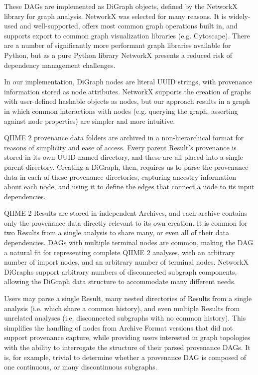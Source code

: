 These DAGs are implemented as DiGraph objects, defined by the NetworkX library
for graph analysis. NetworkX was selected for many reasons. It is widely-used
and well-supported, offers most common graph operations built in, and supports
export to common graph visualization libraries (e.g. Cytoscape). There are a
number of significantly more performant graph libraries available for Python,
but as a pure Python library NetworkX presents a reduced risk of dependency
management challenges.

In our implementation, DiGraph nodes are literal UUID strings, with provenance
information stored as node attributes. NetworkX supports the creation of graphs
with user-defined hashable objects as nodes, but our approach results in a graph
in which common interactions with nodes (e.g. querying the graph, asserting
against node properties) are simpler and more intuitive.

QIIME 2 provenance data folders are archived in a non-hierarchical format for
reasons of simplicity and ease of access. Every parent Result’s provenance is
stored in its own UUID-named directory, and these are all placed into a single
parent directory. Creating a DiGraph, then, requires us to parse the provenance
data in each of these provenance directories, capturing ancestry information
about each node, and using it to define the edges that connect a node to its
input dependencies.

QIIME 2 Results are stored in independent Archives, and each archive contains
only the provenance data directly relevant to its own creation. It is common for
two Results from a single analysis to share many, or even all of their data
dependencies. DAGs with multiple terminal nodes are common, making the DAG a
natural fit for representing complete QIIME 2 analyses, with an arbitrary number
of import nodes, and an arbitrary number of terminal nodes. NetworkX DiGraphs
support arbitrary numbers of disconnected subgraph components, allowing the
DiGraph data structure to accommodate many different needs. 

Users may parse a single Result, many nested directories of Results from a
single analysis (i.e. which share a common history), and even multiple Results
from unrelated analyses (i.e. disconnected subgraphs with no common history).
This simplifies the handling of nodes from Archive Format versions that did not
support provenance capture, while providing users interested in graph topologies
with the ability to interrogate the structure of their parsed provenance DAGs.
It is, for example, trivial to determine whether a provenance DAG is composed of
one continuous, or many discontinuous subgraphs.


